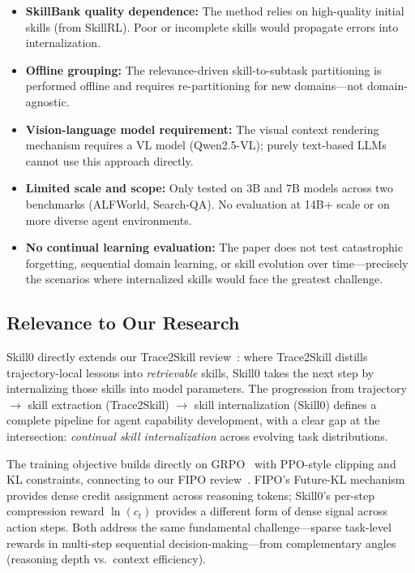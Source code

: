 \documentclass[11pt]{article}
\begin{document}
\begin{itemize}
    \item \textbf{SkillBank quality dependence:} The method relies on high-quality initial skills (from SkillRL). Poor or incomplete skills would propagate errors into internalization.
    \item \textbf{Offline grouping:} The relevance-driven skill-to-subtask partitioning is performed offline and requires re-partitioning for new domains---not domain-agnostic.
    \item \textbf{Vision-language model requirement:} The visual context rendering mechanism requires a VL model (Qwen2.5-VL); purely text-based LLMs cannot use this approach directly.
    \item \textbf{Limited scale and scope:} Only tested on 3B and 7B models across two benchmarks (ALFWorld, Search-QA). No evaluation at 14B+ scale or on more diverse agent environments.
    \item \textbf{No continual learning evaluation:} The paper does not test catastrophic forgetting, sequential domain learning, or skill evolution over time---precisely the scenarios where internalized skills would face the greatest challenge.
\end{itemize}

\subsection{Relevance to Our Research}

Skill0 directly extends our Trace2Skill review~\cite{trace2skill}: where Trace2Skill distills trajectory-local lessons into \textit{retrievable} skills, Skill0 takes the next step by internalizing those skills into model parameters. The progression from trajectory $\to$ skill extraction (Trace2Skill) $\to$ skill internalization (Skill0) defines a complete pipeline for agent capability development, with a clear gap at the intersection: \textit{continual skill internalization} across evolving task distributions.

The training objective builds directly on GRPO~\cite{grpo} with PPO-style clipping and KL constraints, connecting to our FIPO review~\cite{fipo}. FIPO's Future-KL mechanism provides dense credit assignment across reasoning tokens; Skill0's per-step compression reward $\ln(c_t)$ provides a different form of dense signal across action steps. Both address the same fundamental challenge---sparse task-level rewards in multi-step sequential decision-making---from complementary angles (reasoning depth vs.\ context efficiency).
\end{document}

